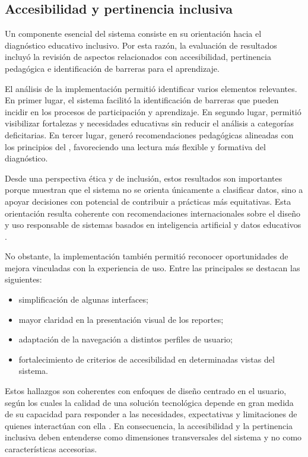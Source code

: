 \begin{refsection}
\section{Accesibilidad y pertinencia inclusiva}

Un componente esencial del sistema consiste en su orientación hacia el diagnóstico educativo inclusivo. Por esta razón, la evaluación de resultados incluyó la revisión de aspectos relacionados con accesibilidad, pertinencia pedagógica e identificación de barreras para el aprendizaje.

El análisis de la implementación permitió identificar varios elementos relevantes. En primer lugar, el sistema facilitó la identificación de barreras que pueden incidir en los procesos de participación y aprendizaje. En segundo lugar, permitió visibilizar fortalezas y necesidades educativas sin reducir el análisis a categorías deficitarias. En tercer lugar, generó recomendaciones pedagógicas alineadas con los principios del \DUA, favoreciendo una lectura más flexible y formativa del diagnóstico.

Desde una perspectiva ética y de inclusión, estos resultados son importantes porque muestran que el sistema no se orienta únicamente a clasificar datos, sino a apoyar decisiones con potencial de contribuir a prácticas más equitativas. Esta orientación resulta coherente con recomendaciones internacionales sobre el diseño y uso responsable de sistemas basados en inteligencia artificial y datos educativos \parencite{unesco2021}.

No obstante, la implementación también permitió reconocer oportunidades de mejora vinculadas con la experiencia de uso. Entre las principales se destacan las siguientes:

\begin{itemize}
\item simplificación de algunas interfaces;
\item mayor claridad en la presentación visual de los reportes;
\item adaptación de la navegación a distintos perfiles de usuario;
\item fortalecimiento de criterios de accesibilidad en determinadas vistas del sistema.
\end{itemize}

Estos hallazgos son coherentes con enfoques de diseño centrado en el usuario, según los cuales la calidad de una solución tecnológica depende en gran medida de su capacidad para responder a las necesidades, expectativas y limitaciones de quienes interactúan con ella \parencite{norman2013}. En consecuencia, la accesibilidad y la pertinencia inclusiva deben entenderse como dimensiones transversales del sistema y no como características accesorias.


\end{refsection}
